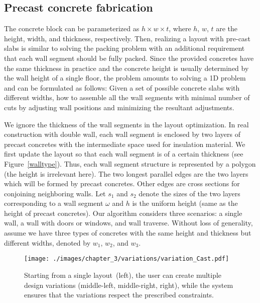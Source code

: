 \subsection{Precast concrete fabrication}

The concrete block can be parameterized as $h \times w \times t$, where $h$, $w$, $t$ are the height, width, and thickness, respectively. Then, realizing a layout with pre-cast slabs is similar to solving the packing problem \cite{korf2003optimal} with an additional requirement that each wall segment should be fully packed. Since the provided concretes have the same thickness in practice and the concrete height is usually determined by the wall height of a single floor, the problem amounts to solving a 1D problem and can be formulated as follows:
Given a set of possible concrete slabs with different widths, how to assemble all the wall segments with minimal number of cuts by adjusting wall positions and minimizing the resultant adjustments.

We ignore the thickness of the wall segments in the layout optimization. In real construction with double wall, each wall segment is enclosed by two layers of precast concretes with the intermediate space used for insulation material. We first update the layout so that each wall segment is of a certain thickness (see Figure~\ref{walltype}). Thus, each wall segment structure is represented by a polygon (the height is irrelevant here). The two longest parallel edges are the two layers which will be formed by precast concretes. Other edges are cross sections for conjoining neighboring walls. Let $s_1$ and $s_2$ denote the sizes of the two layers corresponding to a wall segment $\omega$ and $h$ is the uniform height (same as the height of precast concretes). Our algorithm considers three scenarios: a single wall, a wall with doors or windows, and wall traverse. Without loss of generality, assume we have three types of concretes with the same height and thickness but different widths, denoted by $w_1$, $w_2$, and $w_3$.

\begin{figure}[t!]
\centering
\texttt{[image: ./images/chapter\_3/variations/variation\_Cast.pdf]}
\caption[Design variations of a single floor plan.]{Starting from a single layout~(left), the user can create multiple design variations (middle-left, middle-right, right), while the system ensures that the variations respect the prescribed constraints.}
\label{variations}
\vspace{-.1in}
\end{figure}

